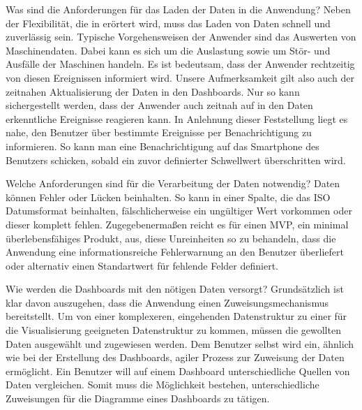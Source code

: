 Was sind die Anforderungen für das Laden der Daten in die Anwendung? Neben der Flexibilität,
die in  erörtert wird, muss das Laden von Daten schnell und zuverlässig
sein. Typische Vorgehensweisen der Anwender sind das Auswerten von Maschinendaten. Dabei kann es
sich um die Auslastung sowie um Stör- und Ausfälle der Maschinen handeln. Es ist bedeutsam,
dass der Anwender rechtzeitig von diesen Ereignissen informiert wird. Unsere
Aufmerksamkeit gilt also auch der zeitnahen Aktualisierung der Daten in den Dashboards. Nur
so kann sichergestellt werden, dass der Anwender auch zeitnah auf in den Daten erkenntliche
Ereignisse reagieren kann. In Anlehnung dieser Feststellung liegt es nahe, den Benutzer
über bestimmte Ereignisse per Benachrichtigung zu informieren. So kann man
eine Benachrichtigung auf das Smartphone des Benutzers schicken, sobald ein zuvor definierter
Schwellwert überschritten wird.

Welche Anforderungen sind für die Verarbeitung der Daten notwendig? Daten können Fehler oder Lücken
beinhalten. So kann in einer Spalte, die das ISO Datumsformat beinhalten, fälschlicherweise ein
ungültiger Wert vorkommen oder dieser komplett fehlen. Zugegebenermaßen reicht es für einen MVP, ein
minimal überlebensfähiges Produkt, aus, diese Unreinheiten so zu behandeln, dass die Anwendung
eine informationsreiche Fehlerwarnung an den Benutzer überliefert oder alternativ einen Standartwert
für fehlende Felder definiert.

Wie werden die Dashboards mit den nötigen Daten versorgt? Grundsätzlich ist klar davon auszugehen,
dass die Anwendung einen Zuweisungsmechanismus bereitstellt. Um von einer komplexeren, eingehenden
Datenstruktur zu einer für die Visualisierung geeigneten Datenstruktur zu kommen, müssen die gewollten
Daten ausgewählt und zugewiesen werden. Dem Benutzer selbst wird ein, ähnlich wie bei der Erstellung
des Dashboards, agiler Prozess zur Zuweisung der Daten ermöglicht. Ein Benutzer will auf einem
Dashboard unterschiedliche Quellen von Daten vergleichen. Somit muss die Möglichkeit bestehen,
unterschiedliche Zuweisungen für die Diagramme eines Dashboards zu tätigen.

